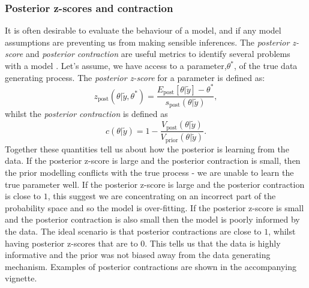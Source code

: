 \documentclass[12pt,english, journal=jpr, layout=twocolumn]{article}
\begin{document}
\subsubsection{Posterior z-scores and contraction}
It is often desirable to evaluate the behaviour of a model, and if any model assumptions are preventing us from making sensible inferences. The \textit{posterior z-score} and \textit{posterior contraction} are useful metrics to identify several problems with a model \citep{Betancourt::2021}. Let's assume, we have access to a parameter,$\theta^*$, of the true data generating process. The \textit{posterior z-score} for a parameter is defined as:
\begin{equation}
z_{\text{post}}(\theta|\tilde{y}, \theta^*) = \frac{E_{\text{post}}[\theta|\tilde{y}] - \theta^*}{s_{\text{post}}(\theta|\tilde{y})},
\end{equation}
whilst the \textit{posterior contraction} is defined as
\begin{equation}
c(\theta|\tilde{y}) = 1 - \frac{V_\text{post}(\theta|\tilde{y})}{V_\text{prior}(\theta|\tilde{y})}.
\end{equation}
Together these quantities tell us about how the posterior is learning from the data. If the posterior z-score is large and the posterior contraction is small, then the prior modelling conflicts with the true process - we are unable to learn the true parameter well. If the posterior z-score is large and the posterior contraction is close to $1$, this suggest we are concentrating on an incorrect part of the probability space and so the model is over-fitting. If the posterior z-score is small and the posterior contraction is also small then the model is poorly informed by the data. The ideal scenario is that posterior contractions are close to $1$, whilst having posterior z-scores that are to $0$. This tells us that the data is highly informative and the prior was not biased away from the data generating mechanism. Examples of posterior contractions are shown in the accompanying vignette.
\end{document}
